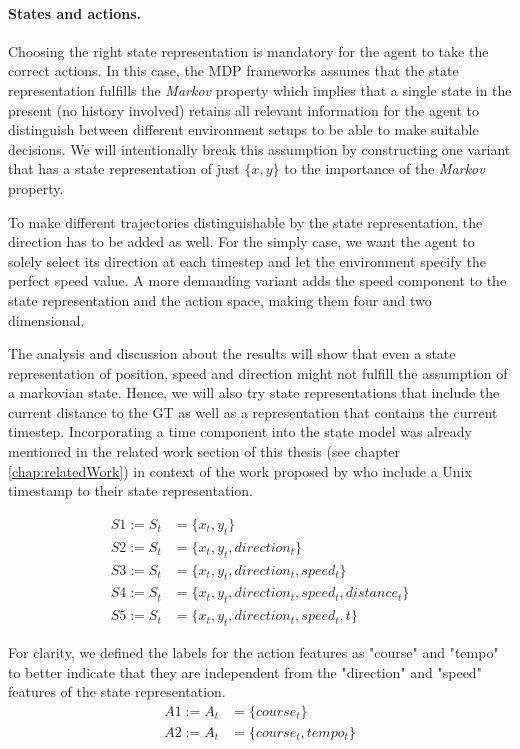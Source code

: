 \paragraph{States and actions.} Choosing the right state representation is mandatory for the agent to take the correct actions. In this case, the MDP frameworks assumes that the state representation fulfills the \textit{Markov} property which implies that a single state in the present (no history involved) retains all relevant information for the agent to distinguish between different environment setups to be able to make suitable decisions. We will intentionally break this assumption by constructing one variant that has a state representation of just $\{x,y\}$ to the importance of the \textit{Markov} property.
\par
To make different trajectories distinguishable by the state representation, the direction has to be added as well. For the simply case, we want the agent to solely select its direction at each timestep and let the environment specify the perfect speed value. A more demanding variant adds the speed component to the state representation and the action space, making them four and two dimensional.
\par
The analysis and discussion about the results will show that even a state representation of position, speed and direction might not fulfill the assumption of a markovian state. Hence, we will also try state representations that include the current distance to the GT as well as a representation that contains the current timestep. Incorporating a time component into the state model was already mentioned in the related work section of this thesis (see chapter \ref{chap:relatedWork}) in context of the work proposed by \cite{liu2019vessel} who include a Unix timestamp to their state representation.

\begin{equation}
\begin{aligned}
    S1 := S_t &= \{x_t,y_t\}
\\
    S2 := S_t &= \{x_t,y_t, direction_t\}
\\
    S3 := S_t &= \{x_t,y_t, direction_t, speed_t\}
\\
    S4 := S_t &= \{x_t,y_t, direction_t, speed_t, distance_t\}
\\
    S5 := S_t &= \{x_t,y_t, direction_t, speed_t, t\}
    \end{aligned}
\end{equation}

For clarity, we defined the labels for the action features as "course" and "tempo" to better indicate that they are independent from the "direction" and "speed" features of the state representation.
\begin{equation}
\begin{aligned}
    A1 := A_t &= \{course_t\}
\\
    A2 := A_t &= \{course_t, tempo_t\}
    \end{aligned}
\end{equation}

